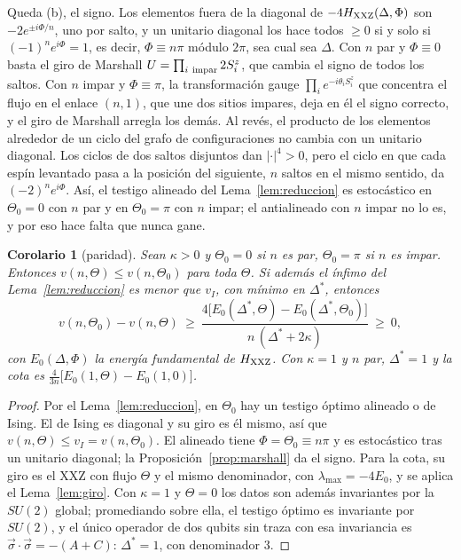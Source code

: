\documentclass[11pt,a4paper]{article}
\newtheorem{corolario}[teorema]{Corolario}
\theoremstyle{remark}
\begin{document}
Queda (b), el signo. Los elementos fuera de la diagonal de $-4H_{\rm XXZ}(\Delta,\Phi)$ son
$-2e^{\pm i\Phi/n}$, uno por salto, y un unitario diagonal los hace todos $\ge0$ si y solo si
$(-1)^ne^{i\Phi}=1$, es decir, $\Phi\equiv n\pi$ módulo $2\pi$, sea cual sea $\Delta$. Con $n$ par
y $\Phi\equiv0$ basta el giro de Marshall $U=\prod_{i\ \rm impar}2S^z_i$, que cambia el signo de todos
los saltos. Con $n$ impar y $\Phi\equiv\pi$, la transformación gauge $\prod_ie^{-i\theta_iS^z_i}$ que
concentra el flujo en el enlace $(n,1)$, que une dos sitios impares, deja en él el signo correcto, y
el giro de Marshall arregla los demás. Al revés, el producto de los elementos alrededor de un ciclo
del grafo de configuraciones no cambia con un unitario diagonal. Los ciclos de dos saltos disjuntos
dan $|\cdot|^4>0$, pero el ciclo en que cada espín levantado pasa a la posición del siguiente, $n$
saltos en el mismo sentido, da $(-2)^ne^{i\Phi}$. Así, el testigo alineado del
Lema~\ref{lem:reduccion} es estocástico en $\Theta_0=0$ con $n$ par y en $\Theta_0=\pi$ con $n$
impar; el antialineado con $n$ impar no lo es, y por eso hace falta que nunca gane.

\begin{corolario}[paridad]\label{cor:paridad}
Sean $\kappa>0$ y $\Theta_0=0$ si $n$ es par, $\Theta_0=\pi$ si $n$ es impar. Entonces
$v(n,\Theta)\le v(n,\Theta_0)$ para toda $\Theta$. Si además el ínfimo del
Lema~\ref{lem:reduccion} es menor que $v_I$, con mínimo en $\Delta^\ast$, entonces
\[
  v(n,\Theta_0)-v(n,\Theta)\ \ge\ \frac{4\big[E_0(\Delta^\ast,\Theta)-E_0(\Delta^\ast,\Theta_0)\big]}
  {n\,(\Delta^\ast+2\kappa)}\ \ge\ 0,
\]
con $E_0(\Delta,\Phi)$ la energía fundamental de $H_{\rm XXZ}$. Con $\kappa=1$ y $n$ par,
$\Delta^\ast=1$ y la cota es $\frac4{3n}\big[E_0(1,\Theta)-E_0(1,0)\big]$.
\end{corolario}

\begin{proof}
Por el Lema~\ref{lem:reduccion}, en $\Theta_0$ hay un testigo óptimo alineado o de Ising. El de
Ising es diagonal y su giro es él mismo, así que $v(n,\Theta)\le v_I=v(n,\Theta_0)$. El alineado
tiene $\Phi=\Theta_0\equiv n\pi$ y es estocástico tras un unitario diagonal; la
Proposición~\ref{prop:marshall} da el signo. Para la cota, su giro es el XXZ con flujo $\Theta$ y el
mismo denominador, con $\lambda_{\max}=-4E_0$, y se aplica el Lema~\ref{lem:giro}. Con $\kappa=1$ y
$\Theta=0$ los datos son además invariantes por la $SU(2)$ global; promediando sobre ella, el
testigo óptimo es invariante por $SU(2)$, y el único operador de dos qubits sin traza con esa
invariancia es $\vec\sigma\cdot\vec\sigma=-(A+C)$: $\Delta^\ast=1$, con denominador $3$.
\end{proof}
\end{document}
